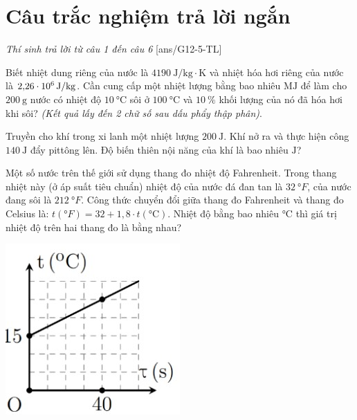 \section{Câu trắc nghiệm trả lời ngắn} \textit{Thí sinh trả lời từ câu 1 đến câu 6}
\setcounter{ex}{0}
[ans/G12-5-TL]
\begin{ex}
	Biết nhiệt dung riêng của nước là $\SI{4190}{\joule/\kilogram\cdot\kelvin}$ và nhiệt hóa hơi riêng của nước là $\SI{2.26E6}{\joule/\kilogram}$. Cần cung cấp một nhiệt lượng bằng bao nhiêu $\si{\mega\joule}$ để làm cho $\SI{200}{\gram}$ nước có nhiệt độ $\SI{10}{\celsius}$ sôi ở $\SI{100}{\celsius}$ và $\SI{10}{\percent}$ khối lượng của nó đã hóa hơi khi sôi? \textit{(Kết quả lấy đến 2 chữ số sau dấu phẩy thập phân)}.
\end{ex}
\begin{ex}
Truyền cho khí trong xi lanh một nhiệt lượng $\SI{200}{\joule}$. Khí nở ra và thực hiện công $\SI{140}{\joule}$ đẩy pittông lên. Độ biến thiên nội năng của khí là bao nhiêu $\si{\joule}$?
\end{ex}
\begin{ex}
	Một số nước trên thế giới sử dụng thang đo nhiệt độ Fahrenheit. Trong thang nhiệt này (ở áp suất tiêu chuẩn) nhiệt độ của nước đá đan tan là $\SI{32}{\degree F}$, của nước đang sôi là $\SI{212}{\degree F}$. Công thức chuyển đổi giữa thang đo Fahrenheit và thang đo Celsius là: $t\left(\si{\degree F}\right)=32+1,8 \cdot t\left(\si{\celsius}\right)$. Nhiệt độ bằng bao nhiêu $\si{\celsius}$ thì giá trị nhiệt độ trên hai thang đo là bằng nhau?
	\end{ex}
	\begin{ex}
	{
	\includegraphics[width=0.4\linewidth]{../figs/D12-5-4}
	}
	\end{ex}
